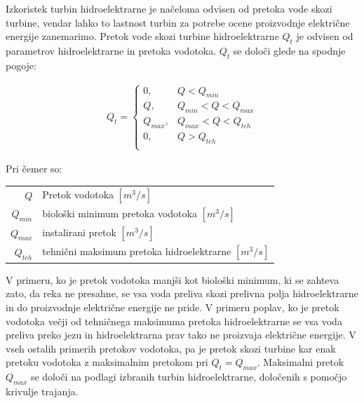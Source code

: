 
Izkoristek turbin hidroelektrarne je načeloma odvisen od pretoka vode skozi turbine, vendar lahko to lastnost turbin za potrebe ocene proizvodnje električne energije zanemarimo. Pretok vode skozi turbine hidroelektrarne $Q_t$ je odvisen od parametrov hidroelektrarne in pretoka vodotoka. $Q_t$ se določi glede na spodnje pogoje:

\begin{ceqn}
	\begin{align}
	Q_t = \begin{cases}
	0, &Q < Q_{min}\\
	Q, &Q_{min} < Q < Q_{max}\\
	Q_{max}, &Q_{max}< Q < Q_{teh}\\
	0, &Q > Q_{teh}\\
	\end{cases}
	\end{align}
\end{ceqn}

Pri čemer so:
\begin{table}[htb!]
	\begin{tabular}{r|p{10cm}}
		$Q$ & Pretok vodotoka $\left[m^3/s \right]$\\
		$Q_{min}$ & biološki minimum pretoka vodotoka $\left[m^3/s \right]$ \\
		$Q_{max}$ & instalirani pretok $\left[m^3/s \right]$ \\
		$Q_{teh}$ & tehnični maksimum pretoka hidroelektrarne $\left[m^3/s \right]$ \\
	\end{tabular}
\end{table}

V primeru, ko je pretok vodotoka manjši kot biološki minimum, ki se zahteva zato, da reka ne presahne, se vsa voda preliva skozi prelivna polja hidroelektrarne in do proizvodnje električne energije ne pride. V primeru poplav, ko je pretok vodotoka večji od tehničnega maksimuma pretoka hidroelektrarne se vsa voda preliva preko jezu in hidroelektrarna prav tako ne proizvaja električne energije. V vseh ostalih primerih pretokov vodotoka, pa je pretok skozi turbine kar enak pretoku vodotoka z maksimalnim pretokom pri $Q_t = Q_{max}$. Maksimalni pretok $Q_{max}$ se določi na podlagi izbranih turbin hidroelektrarne, določenih s pomočjo krivulje trajanja.


